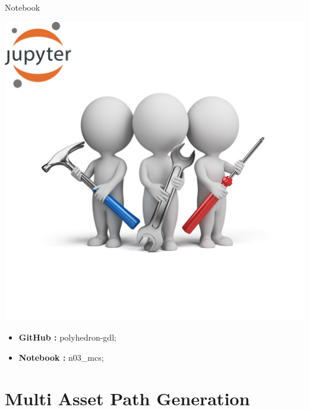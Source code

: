 \documentclass[11pt]{beamer}
\begin{document}
\begin{frame}{Notebook}
\noindent\begin{minipage}{0.5\textwidth}%
\includegraphics[width=\linewidth]{img/exercise.jpg}
\end{minipage}%
\hfill%
\begin{minipage}{0.5\textwidth}
\begin{itemize}
\item {\bf GitHub        : }    polyhedron-gdl;
\item {\bf Notebook      : }    n03\_mcs;
\end{itemize}
\end{minipage}
\end{frame}
\section{Multi Asset Path Generation}
\end{document}
